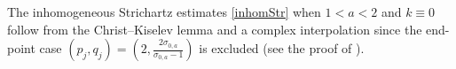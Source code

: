 \documentclass[10pt,a4paper]{article}
\numberwithin{equation}{section}
\def\s{\sigma}
\begin{document}
The inhomogeneous Strichartz estimates \eqref{inhomStr} when $1<a<2$ and $k\equiv 0$ follow from the Christ--Kiselev lemma \cite{CK} and a complex interpolation since the end-point case $(p_j,q_j)=(2,\frac{2\s_{0,a}}{\s_{0,a}-1})$ is excluded (see the proof of \cite[Theorem 6]{BT}).
\end{document}
